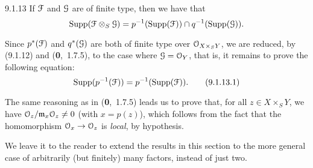 \documentclass[../main.tex]{subfiles}
\begin{document}
\begin{cx}[Corollary]{9.1.13}
    If $\mathcal{F}$ and $\mathcal{G}$ are of finite type, then we have that
    \begin{equation*}
        \operatorname{Supp}(\mathcal{F}\otimes_S\mathcal{G}) = p^{-1}(\operatorname{Supp}(\mathcal{F}))\cap q^{-1}(\operatorname{Supp}(\mathcal{G})).
    \end{equation*}
\end{cx}

Since $p^*(\mathcal{F})$ and $q^*(\mathcal{G})$ are both of finite type over $\mathcal{O}_{X\times_S Y}$, we are reduced, by (9.1.12) and (\textbf{0},~1.7.5), to the case where $\mathcal{G}=\mathcal{O}_Y$, that is, it remains to prove the following equation:
\begin{equation*}
    \operatorname{Supp}(p^{-1}(\mathcal{F})) = p^{-1}(\operatorname{Supp}(\mathcal{F})).\tag{9.1.13.1}
\end{equation*}

The same reasoning as in (\textbf{0},~1.7.5) leads us to prove that, for all $z\in X\times_S Y$, we have $\mathcal{O}_z/\mathfrak{m}_x\mathcal{O}_z\neq0$ (with $x=p(z)$), which follows from the fact that the homomorphism $\mathcal{O}_x\to\mathcal{O}_z$ is \emph{local}, by hypothesis.

We leave it to the reader to extend the results in this section to the more general case of arbitrarily (but finitely) many factors, instead of just two.
\end{document}

